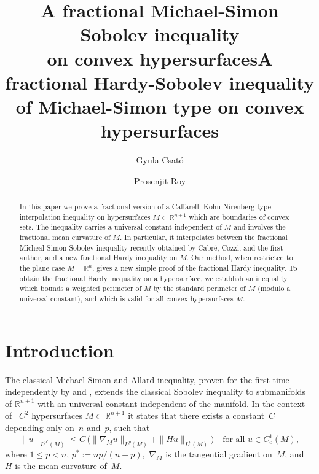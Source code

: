 \documentclass[reqno,12pt]{amsart}
\title[A fractional Sobolev inequality on convex hypersurfaces]{A fractional Michael-Simon Sobolev inequality\\ on convex hypersurfaces}
\author{Gyula Csat\'o}
\author{Prosenjit Roy}
\newcommand{\R}{\mathbb{R}}
\numberwithin{equation}{section}
\theoremstyle{plain}
\theoremstyle{definition}
\renewcommand{\leq}{\leqslant}
\begin{document}
\title[ Hardy Inequality ]{A fractional Hardy-Sobolev inequality of Michael-Simon type on convex hypersurfaces }










\maketitle
\begin{abstract}
In this paper we prove a fractional version of a Caffarelli-Kohn-Nirenberg type interpolation inequality on hypersurfaces $M\subset\R^{n+1}$ which are boundaries of convex sets. The inequality carries a universal constant independent of $M$ and involves the fractional mean curvature of $M.$ In particular, it interpolates between the fractional Micheal-Simon Sobolev inequality recently obtained by Cabr\'e, Cozzi, and the first author, and a new fractional Hardy inequality on $M$. Our method, when restricted to the plane case $M=\R^n$, gives a new simple proof of the fractional Hardy inequality.  To obtain the fractional Hardy inequality on a hypersurface, we establish an inequality which bounds a weighted perimeter of $M$ by  the standard perimeter of $M$ (modulo a universal constant), and which is valid for all convex hypersurfaces $M$.  
\end{abstract}

\section{Introduction}
The classical Michael-Simon and Allard inequality, proven for the first time independently by \cite{Allard} and \cite{Michael-Simon}, extends the classical Sobolev inequality to submanifolds of $\mathbb{R}^{n+1}$ with an universal constant independent of the manifold. In the context of  ~$C^2$ hypersurfaces  $M\subset\R^{n+1}$ it states that there 
exists a constant~$C$ depending only on~$n$ and~$p$, such that
\begin{equation}
 \label{eq:intro:classical MS}
  \|u\|_{L^{p^{\ast}}(M)}\leq C \, \Big( \|\nabla_{\! M} u\|_{L^p(M)}+\|Hu\|_{L^p(M)} \Big) \quad
  \text{for all }u\in C_c^1(M),
\end{equation}
where $1\leq p<n$, $p^{\ast} := {np}/({n-p}),$  $\nabla_{\! M}$ is the tangential gradient on~$M$, and~$H$ is the mean curvature of~$M.$ 
\end{document}
